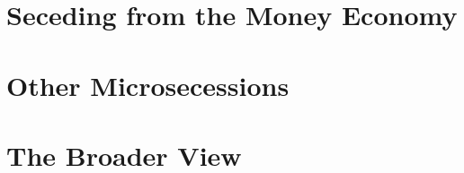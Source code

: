 \documentclass{book}
\begin{document}
\frontmatter




\tableofcontents

\mainmatter



\part{Seceding from the Money Economy}





\part{Other Microsecessions}






\part{The Broader View}





\end{document}
